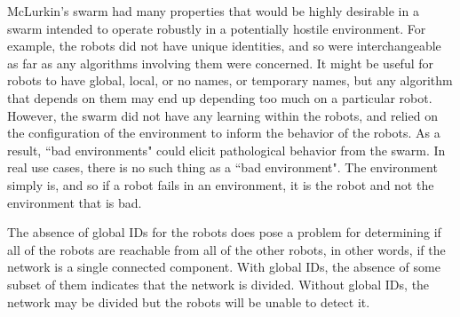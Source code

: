 \documentclass[]{article}
\begin{document}
McLurkin's swarm had many properties that would be highly desirable in a swarm intended to operate robustly in a potentially hostile environment. 
For example, the robots did not have unique identities, and so were interchangeable as far as any algorithms involving them were concerned. 
It might be useful for robots to have global, local, or no names, or temporary names, but any algorithm that depends on them may end up depending too much on a particular robot. 
However, the swarm did not have any learning within the robots, and relied on the configuration of the environment to inform the behavior of the robots. 
As a result, ``bad environments" could elicit pathological behavior from the swarm. 
In real use cases, there is no such thing as a ``bad environment". 
The environment simply is, and so if a robot fails in an environment, it is the robot and not the environment that is bad. 

The absence of global IDs for the robots does pose a problem for determining if all of the robots are reachable from all of the other robots, in other words, if the network is a single connected component. 
With global IDs, the absence of some subset of them indicates that the network is divided. 
Without global IDs, the network may be divided but the robots will be unable to detect it. 
\end{document}
